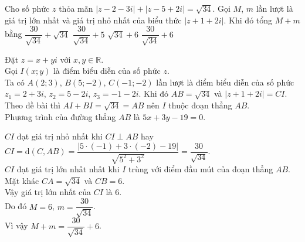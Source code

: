 \begin{ex}%
 Cho số phức $z$ thỏa mãn $|z-2-3i|+|z-5+2i|=\sqrt{34}$. Gọi $M$, $m$ lần lượt là giá trị lớn nhất và giá trị nhỏ nhất của biểu thức $|z+1+2i|$. Khi đó tổng $M+m$ bằng
 \choice
  {$\dfrac{30}{\sqrt{34}}+\sqrt{34}$}
  {$\dfrac{30}{\sqrt{34}}+5$}
  {$\sqrt{34}+6$}
  {\True $\dfrac{30}{\sqrt{34}}+6$}
 \loigiai
  {
  \immini
  {
  Đặt $z=x+yi$ với $x,y\in\mathbb{R}$.\\
  Gọi $I(x;y)$ là điểm biểu diễn của số phức $z$.\\
  Ta có $A(2;3)$, $B(5;-2)$, $C(-1;-2)$ lần lượt là điểm biểu diễn của số phức $z_1=2+3i$, $z_2=5-2i$, $z_3=-1-2i$. Khi đó $AB=\sqrt{34}$ và $|z+1+2i|=CI$.\\
  Theo đề bài thì $AI+BI=\sqrt{34}=AB$ nên $I$ thuộc đoạn thẳng $AB$.\\
  Phương trình của đường thẳng $AB$ là $5x+3y-19=0$.\\
  }
  {
  }
  \noindent
  $CI$ đạt giá trị nhỏ nhất khi $CI\perp AB$ hay $CI=\mathrm{d}(C,AB)=\dfrac{|5\cdot (-1)+3\cdot(-2)-19|}{\sqrt{5^2+3^2}}=\dfrac{30}{\sqrt{34}}$.\\
  $CI$ đạt giá trị lớn nhất nhất khi $I$ trùng với điểm đầu mút của đoạn thẳng $AB$.\\
  Mặt khác $CA=\sqrt{34}$ và $CB=6$.\\
  Vậy giá trị lớn nhất của $CI$ là $6$.\\
  Do đó $M=6$, $m=\dfrac{30}{\sqrt{34}}$.\\
  Vì vậy $M+m=\dfrac{30}{\sqrt{34}}+6$.
  }
\end{ex}

